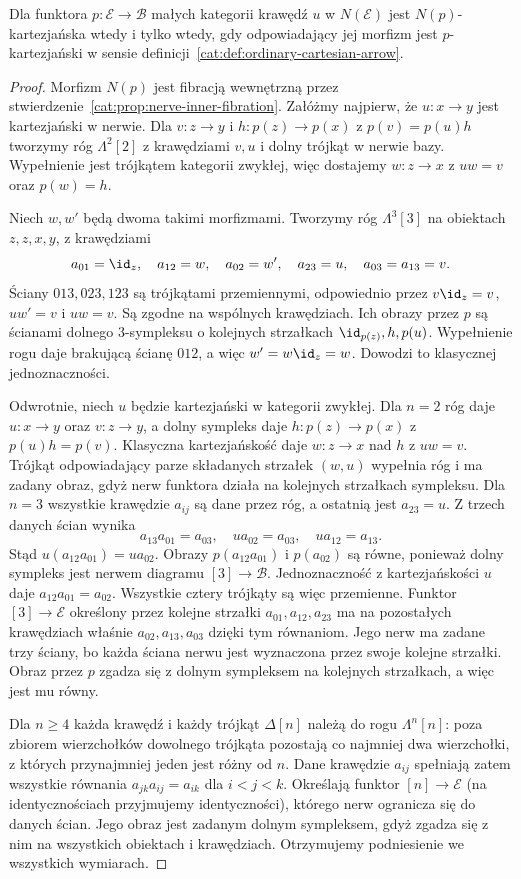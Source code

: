 \begin{stwierdzenie}\label{cat:prop:cartesian-nerve}
Dla funktora $p:\mathcal E\to\mathcal B$ małych kategorii krawędź $u$ w $N(\mathcal E)$ jest $N(p)$-kartezjańska wtedy i tylko wtedy, gdy odpowiadający jej morfizm jest $p$-kartezjański w sensie definicji~\ref{cat:def:ordinary-cartesian-arrow}.
\end{stwierdzenie}
\begin{proof}
Morfizm $N(p)$ jest fibracją wewnętrzną przez stwierdzenie~\ref{cat:prop:nerve-inner-fibration}. Załóżmy najpierw, że $u:x\to y$ jest kartezjański w nerwie. Dla $v:z\to y$ i $h:p(z)\to p(x)$ z $p(v)=p(u)h$ tworzymy róg $\Lambda^2[2]$ z krawędziami $v,u$ i dolny trójkąt w nerwie bazy. Wypełnienie jest trójkątem kategorii zwykłej, więc dostajemy $w:z\to x$ z $uw=v$ oraz $p(w)=h$.

Niech $w,w'$ będą dwoma takimi morfizmami. Tworzymy róg $\Lambda^3[3]$ na obiektach $z,z,x,y$, z krawędziami
\[
 a_{01}=\id_z,\quad a_{12}=w,\quad a_{02}=w',
 \quad a_{23}=u,\quad a_{03}=a_{13}=v.
\]
Ściany $013,023,123$ są trójkątami przemiennymi, odpowiednio przez $v\id_z=v$, $uw'=v$ i $uw=v$. Są zgodne na wspólnych krawędziach. Ich obrazy przez $p$ są ścianami dolnego 3-sympleksu o kolejnych strzałkach $\id_{p(z)},h,p(u)$. Wypełnienie rogu daje brakującą ścianę $012$, a więc $w'=w\id_z=w$. Dowodzi to klasycznej jednoznaczności.

Odwrotnie, niech $u$ będzie kartezjański w kategorii zwykłej. Dla $n=2$ róg daje $u:x\to y$ oraz $v:z\to y$, a dolny sympleks daje $h:p(z)\to p(x)$ z $p(u)h=p(v)$. Klasyczna kartezjańskość daje $w:z\to x$ nad $h$ z $uw=v$. Trójkąt odpowiadający parze składanych strzałek $(w,u)$ wypełnia róg i ma zadany obraz, gdyż nerw funktora działa na kolejnych strzałkach sympleksu. Dla $n=3$ wszystkie krawędzie $a_{ij}$ są dane przez róg, a ostatnią jest $a_{23}=u$. Z trzech danych ścian wynika
\[
 a_{13}a_{01}=a_{03},\quad
 ua_{02}=a_{03},\quad
 ua_{12}=a_{13}.
\]
Stąd $u(a_{12}a_{01})=ua_{02}$. Obrazy $p(a_{12}a_{01})$ i $p(a_{02})$ są równe, ponieważ dolny sympleks jest nerwem diagramu $[3]\to\mathcal B$. Jednoznaczność z kartezjańskości $u$ daje $a_{12}a_{01}=a_{02}$. Wszystkie cztery trójkąty są więc przemienne. Funktor $[3]\to\mathcal E$ określony przez kolejne strzałki $a_{01},a_{12},a_{23}$ ma na pozostałych krawędziach właśnie $a_{02},a_{13},a_{03}$ dzięki tym równaniom. Jego nerw ma zadane trzy ściany, bo każda ściana nerwu jest wyznaczona przez swoje kolejne strzałki. Obraz przez $p$ zgadza się z dolnym sympleksem na kolejnych strzałkach, a więc jest mu równy.

Dla $n\geq4$ każda krawędź i każdy trójkąt $\Delta[n]$ należą do rogu $\Lambda^n[n]$: poza zbiorem wierzchołków dowolnego trójkąta pozostają co najmniej dwa wierzchołki, z których przynajmniej jeden jest różny od $n$. Dane krawędzie $a_{ij}$ spełniają zatem wszystkie równania $a_{jk}a_{ij}=a_{ik}$ dla $i<j<k$. Określają funktor $[n]\to\mathcal E$ (na identycznościach przyjmujemy identyczności), którego nerw ogranicza się do danych ścian. Jego obraz jest zadanym dolnym sympleksem, gdyż zgadza się z nim na wszystkich obiektach i krawędziach. Otrzymujemy podniesienie we wszystkich wymiarach.
\end{proof}

